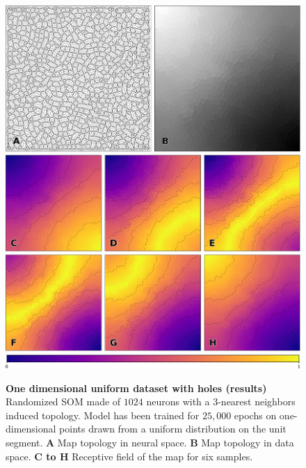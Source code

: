 \begin{figure}
  \includegraphics[width=\columnwidth]{experiment-1D-uniform.pdf}
  \vspace{2mm}
  \centering
  \includegraphics[width=.975\columnwidth]{figures/colormap.pdf}
  \caption{%
  {\bfseries \sffamily One dimensional uniform dataset with holes (results)}
  Randomized SOM made of $1024$ neurons with a $3$-nearest neighbors induced topology. Model has been trained for $25,000$ epochs on one-dimensional points drawn from a uniform distribution on the unit segment. \textbf{A} Map topology in neural space. \textbf{B} Map topology in data space. \textbf{C to H} Receptive field of the map for six samples.
  }
  \label{fig:1D-uniform:results}
\end{figure}
